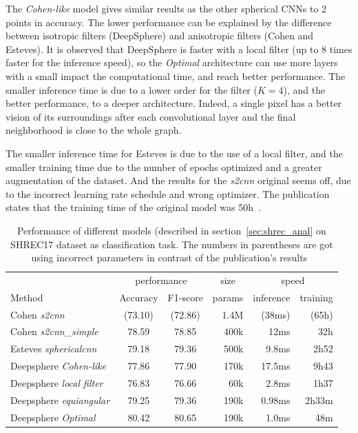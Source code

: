 \documentclass[11pt]{report}
\begin{document}
The \emph{Cohen-like} model gives similar results as the other spherical CNNs to 2 points in accuracy. The lower performance can be explained by the difference between isotropic filters (DeepSphere) and anisotropic filters (Cohen and Esteves). It is observed that DeepSphere is faster with a local filter (up to 8 times faster for the inference speed), so the \emph{Optimal} architecture can use more layers with a small impact the computational time, and reach better performance. The smaller inference time is due to a lower order for the filter ($K=4$), and the better performance, to a deeper architecture. Indeed, a single pixel has a better vision of its surroundings after each convolutional layer and the final neighborhood is close to the whole graph.

The smaller inference time for Esteves is due to the use of a local filter, and the smaller training time due to the number of epochs optimized and a greater augmentation of the dataset. And the results for the \emph{s2cnn} original seems off, due to the incorrect learning rate schedule and wrong optimizer. The publication states that the training time of the original model was 50h~\cite{cohen_convolutional_2017}.

\begin{table}[ht]
    \centering
    \begin{tabular}{l|c c r r r}
        \multicolumn{1}{l}{} & \multicolumn{2}{c}{performance} & \multicolumn{1}{c}{size} & \multicolumn{2}{c}{speed}\\
        \cmidrule(lr){2-3} \cmidrule(lr){4-4} \cmidrule(lr){5-6}
        \multicolumn{1}{l}{Method} & Accuracy & F1-score & params & inference & training \\ \hline
        Cohen \emph{s2cnn} & (73.10) & (72.86) & 1.4M & (38ms) & (65h)\\
        Cohen \emph{s2cnn\_simple} & 78.59 & 78.85 & 400k & 12ms & 32h\\
        Esteves \emph{sphericalcnn} & 79.18 & 79.36 & 500k & 9.8ms & 2h52\\ \hline
        Deepsphere \emph{Cohen-like} & 77.86 & 77.90 & 170k & 17.5ms & 9h43\\
        Deepsphere \emph{local filter} & 76.83 & 76.66 & 60k & 2.8ms & 1h37\\
        Deepsphere \emph{equiangular} & 79.25 & 79.36 & 190k & 0.98ms & 2h33m \\
        Deepsphere \emph{Optimal} & 80.42 & 80.65 & 190k & 1.0ms & 48m
    \end{tabular}
    \caption{Performance of different models (described in section~\ref{sec:shrec_anal} on SHREC17 dataset as classification task. The numbers in parentheses are got using incorrect parameters in contrast of the publication's results~\cite{cohen_spherical_2018}}
    \label{tab:SHREC17_class}
\end{table}
\end{document}
